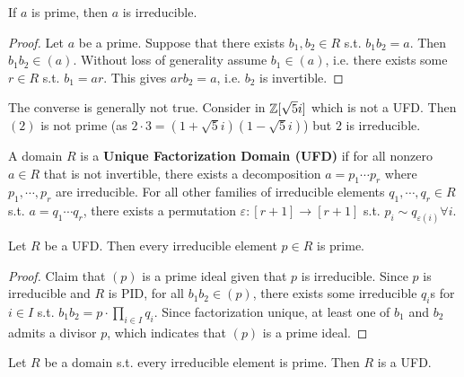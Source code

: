 \documentclass{article}
\begin{document}
\begin{proposition}\label{prop:prime is irreducible}
    If $a$ is prime, then $a$ is irreducible.
\end{proposition}

\begin{proof}
    Let $a$ be a prime. Suppose that there exists $b_1, b_2\in R$ s.t. $b_1 b_2 = a$. Then $b_1 b_2 \in (a)$. Without loss of generality assume $b_1\in (a)$, i.e. there exists some $r\in R$ s.t. $b_1 = ar$. This gives $arb_2 = a$, i.e. $b_2$ is invertible.
\end{proof}

\begin{remark}
    The converse is generally not true. Consider in $\mathbb{Z}[\sqrt{5}i]$ which is not a UFD. Then $(2)$ is not prime (as $2\cdot 3 = (1 + \sqrt{5}i)(1 - \sqrt{5}i)$) but $2$ is irreducible.
\end{remark}

\begin{definition}
    A domain $R$ is a \textbf{Unique Factorization Domain (UFD)} if for all  nonzero $a\in R$ that is not invertible, there exists a decomposition $a = p_1\cdots p_r$ where $p_1, \cdots, p_r$ are irreducible. For all other families of irreducible elements $q_1, \cdots, q_r \in R$ s.t. $a = q_1\cdots q_r$, there exists a permutation $\varepsilon: [r+1] \to [r+1]$ s.t. $p_i \sim q_{\varepsilon(i)} \forall i$. 
\end{definition}

\begin{proposition}\label{prop:UFD irreducible is prime}
    Let $R$ be a UFD. Then every irreducible element $p\in R$ is prime.    
\end{proposition}

\begin{proof}
    Claim that $(p)$ is a prime ideal given that $p$ is irreducible. Since $p$ is irreducible and $R$ is PID, for all $b_1 b_2\in (p)$, there exists some irreducible $q_i$s for $i\in I$ s.t. $b_1 b_2 = p\cdot \prod_{i\in I} q_i$. Since factorization unique, at least one of $b_1$ and $b_2$ admits a divisor $p$, which indicates that $(p)$ is a prime ideal. 
\end{proof}

\begin{proposition}\label{prop:irreducible is prime implies UFD}
    Let $R$ be a domain s.t. every irreducible element is prime. Then $R$ is a UFD.
\end{proposition}
\end{document}
